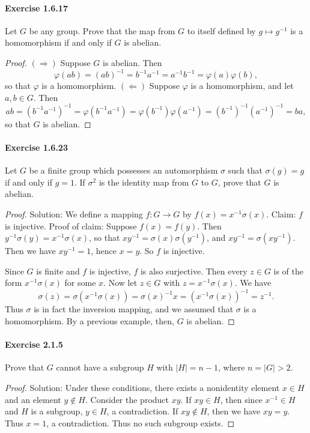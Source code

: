 \documentclass{article}
\theoremstyle{definition}
\begin{document}
\paragraph{Exercise 1.6.17} Let $G$ be any group. Prove that the map from $G$ to itself defined by $g \mapsto g^{-1}$ is a homomorphism if and only if $G$ is abelian.
\begin{proof}
    $(\Rightarrow)$ Suppose $G$ is abelian. Then
$$
\varphi(a b)=(a b)^{-1}=b^{-1} a^{-1}=a^{-1} b^{-1}=\varphi(a) \varphi(b),
$$
so that $\varphi$ is a homomorphism.
$(\Leftarrow)$ Suppose $\varphi$ is a homomorphism, and let $a, b \in G$. Then
$$
a b=\left(b^{-1} a^{-1}\right)^{-1}=\varphi\left(b^{-1} a^{-1}\right)=\varphi\left(b^{-1}\right) \varphi\left(a^{-1}\right)=\left(b^{-1}\right)^{-1}\left(a^{-1}\right)^{-1}=b a,
$$
so that $G$ is abelian.
\end{proof}



\paragraph{Exercise 1.6.23} Let $G$ be a finite group which possesses an automorphism $\sigma$ such that $\sigma(g)=g$ if and only if $g=1$. If $\sigma^{2}$ is the identity map from $G$ to $G$, prove that $G$ is abelian.
\begin{proof}
    Solution: We define a mapping $f: G \rightarrow G$ by $f(x)=x^{-1} \sigma(x)$.
Claim: $f$ is injective.
Proof of claim: Suppose $f(x)=f(y)$. Then $y^{-1} \sigma(y)=x^{-1} \sigma(x)$, so that $x y^{-1}=\sigma(x) \sigma\left(y^{-1}\right)$, and $x y^{-1}=\sigma\left(x y^{-1}\right)$. Then we have $x y^{-1}=1$, hence $x=y$. So $f$ is injective.

Since $G$ is finite and $f$ is injective, $f$ is also surjective. Then every $z \in G$ is of the form $x^{-1} \sigma(x)$ for some $x$. Now let $z \in G$ with $z=x^{-1} \sigma(x)$. We have
$$
\sigma(z)=\sigma\left(x^{-1} \sigma(x)\right)=\sigma(x)^{-1} x=\left(x^{-1} \sigma(x)\right)^{-1}=z^{-1} .
$$
Thus $\sigma$ is in fact the inversion mapping, and we assumed that $\sigma$ is a homomorphism. By a previous example, then, $G$ is abelian.
\end{proof}



\paragraph{Exercise 2.1.5} Prove that $G$ cannot have a subgroup $H$ with $|H|=n-1$, where $n=|G|>2$.
\begin{proof}
    Solution: Under these conditions, there exists a nonidentity element $x \in H$ and an element $y \notin H$. Consider the product $x y$. If $x y \in H$, then since $x^{-1} \in H$ and $H$ is a subgroup, $y \in H$, a contradiction. If $x y \notin H$, then we have $x y=y$. Thus $x=1$, a contradiction. Thus no such subgroup exists.
\end{proof}
\end{document}

